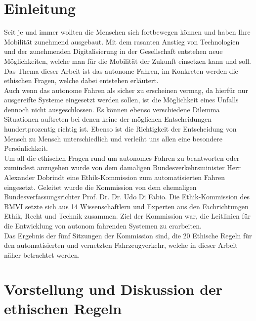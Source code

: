 \documentclass[twoside,a4paper,12pt]{article}
\begin{document}
\section{Einleitung} \label{Einleitung}
Seit je und immer wollten die Menschen sich fortbewegen können und haben Ihre Mobilität zunehmend ausgebaut. Mit dem rasanten Anstieg von Technologien und der zunehmenden Digitalisierung in der Gesellschaft entstehen neue Möglichkeiten, welche man für die Mobilität der Zukunft einsetzen kann und soll. Das Thema dieser Arbeit ist das autonome Fahren, im Konkreten werden die ethischen Fragen, welche dabei entstehen erläutert. \\ Auch wenn das autonome Fahren als sicher zu erscheinen vermag, da hierfür nur ausgereifte Systeme eingesetzt werden sollen, ist die Möglichkeit eines Unfalls dennoch nicht ausgeschlossen. Es können ebenso verschiedene Dilemma Situationen auftreten bei denen keine der möglichen Entscheidungen hundertprozentig richtig ist. Ebenso ist die Richtigkeit der Entscheidung von Mensch zu Mensch unterschiedlich und verleiht uns allen eine besondere Persönlichkeit. \\ Um all die ethischen Fragen rund um autonomes Fahren zu beantworten oder zumindest anzugehen wurde von dem damaligen Bundesverkehrsminister Herr Alexander Dobrindt eine Ethik-Kommission zum automatisierten Fahren eingesetzt. Geleitet wurde die Kommission von dem ehemaligen Bundesverfassungsrichter Prof. Dr. Dr. Udo Di Fabio. Die Ethik-Kommission des BMVI setzte sich aus 14 Wissenschaftlern und Experten aus den Fachrichtungen Ethik, Recht und Technik zusammen. \cite{bmvi1} Ziel der Kommission war, die Leitlinien für die Entwicklung von autonom fahrenden Systemen zu erarbeiten. \\
Das Ergebnis der fünf Sitzungen der Kommission sind, die 20 Ethische Regeln für den automatisierten
und vernetzten Fahrzeugverkehr, welche in dieser Arbeit näher betrachtet werden. 

\newpage

\tableofcontents


\listoffigures

\newpage

\mainmatter

\cleardoublepage
\section{Vorstellung und Diskussion der ethischen Regeln} \label{VorstellungUndDiskussionDerEthischenRegeln}
\end{document}
